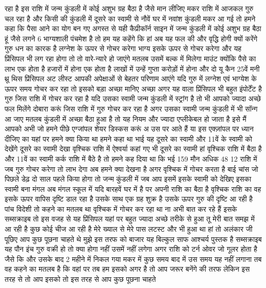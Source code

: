 रहा है इस राशि में जन्म कुंडली में कोई अशुभ ग्रह बैठा है जैसे मान लीजिए मकर राशि में आजकल गुरु चल रहा है और किसी की
कुंडली में दूसरे का स्वामी से नौवें घर में नवांश कुंडली मकर आ गई तो हमने कहा कि पैसा आने का योग बन गए अगस्त से यही
कैप्रीकॉर्न साइन में जन्म कुंडली में कोई अशुभ ग्रह बैठा हूं जैसे लगने 6 भाग्यशाली पंचमेश है तो हम यह कहेंगे कि हां अब यह
फल की और वृद्धि होगी क्यों करेंगे गुरु धन का कारक है लग्नेश के ऊपर से गोचर
करेगा भाग्य इसके ऊपर से गोचर करेगा और यह प्रिंसिपल भी लग रहा होगा तो तो वारे-न्यारे हो जाएंगे मतलब उसमें बल्क
में मिलेगा माउंट क्योंकि पैसे का लाभ एक होता है हजारों में होना एक होता है लाखों में उन्हें गुप्ता करोड़ों में होना और दो
यू कैन 25वें मनी थ्रू थिस प्रिंसिपल अट लीस्ट आपकी अपेक्षाओं से बेहतर परिणाम आएंगे यदि गुरु
में लग्नेश एवं भाग्येश के ऊपर समय गोचर कर रहा तो इसको बड़ा अच्छा मानिए अच्छा अगर यह वाला प्रिंसिपल भी बहुत इंपोर्टेंट
है गुरु जिस राशि में गोचर कर रहा है यदि उसका स्वामी जन्म कुंडली में स्ट्रांग है
तो भी आपको ज्यादा अच्छे फल मिलेंगे दोबारा करूं जिस राशि में गुरु गोचर कर
रहा है अगर उसका स्वामी जन्म कुंडली में भी सॉन्ग आ जाए मतलब कुंडली में अच्छा बैठा हुआ है तो यह नियम और ज्यादा
एप्लीकेबल हो जाता है इसे मैं आपको अभी जो हमने पीछे एग्जांपल शेयर डिस्कस करूं अ उस पर आते हैं या इस एक्ज़ांपल पर ध्यान
दीजिए का यहां पर हमने क्या किया था हमने कहा था भाई यह दूसरे का स्वामी और 11वें
के स्वामी को देखेंगे दूसरे का स्वामी देखा वृश्चिक राशि में ऐश्वर्या कहां गए भी दूसरे का स्वामी हां वृश्चिक राशि में
बैठा है और 11वें का स्वामी कर्क राशि में बैठे है तो हमने कह दिया था कि भई 159 मौन अधिक
48 12 राशि में जब गुरु गोचर करेगा तो लाभ देगा अब हमने क्या देखना है अगर वृश्चिक
में गोचर करता है बाई चांस जो पिछले डेढ़ दो साल पहले किया होगा तो जन्म कुंडली में जब आप इसमें इसके स्वामी को देखिए इसका
स्वामी बना मंगल अब मंगल स्कूल में यदि बारहवें घर में है पर अपनी राशि का बैठा
है वृश्चिक राशि का वह इसके ऊपर वापिस दृष्टि डाल रहा है उसके साथ एक ग्रह शुक्र
है उसके ऊपर गुरु की दृष्टि आ रही है पांच विदेशी तो कहने का मतलब था वृश्चिक में
गोचर कर रहा था ना अभी बात कर रहे हैं इसके सब्सक्राइब तो इस वजह से यह
प्रिंसिपल यहां पर बहुत ज्यादा अच्छे तरीके से हुआ तू मेरी बात समझ में आ रही है कुछ कोई चीज
आ रही है मेरे ख्याल से मेरे पास लटस्ट और भी
हुआ था हां तो अलंकार जी पूछिए आप कुछ पूछना चाहते थे मुझे इस तरफ को बाजार यह
बिल्कुल साफ आश्चर्य पुस्तक है सब्सक्राइब
यह पौन इंच गुरु वक्री हो तो क्या होगा नहीं उसमें नहीं लगेगा अगर राशि को टर्न
ओवर जो गूलर होता है जैसे कि और उसके बाद 2 महीने में निकल गया मकर में कुछ समय बाद
में उस समय यह नहीं लगाना तब वह कहने का
मतलब है कि वहां पर तब हम इसको अगर है तो
आप जरूर बनेंगे की तरफ लेकिन इस तरह से तो आप इसको तो इस तरह से आप कुछ पूछना चाहते
